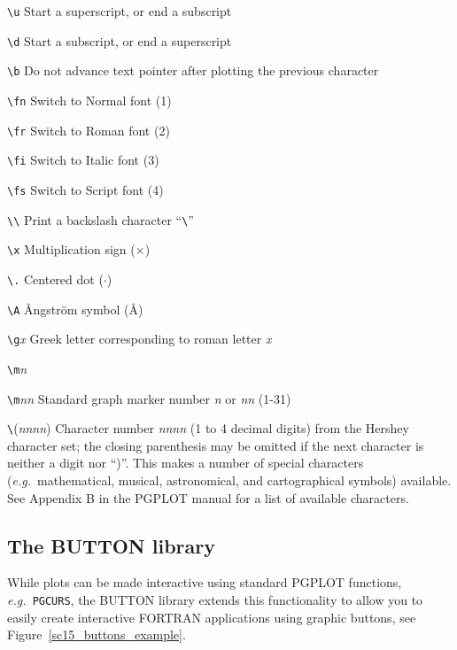 \documentclass[twoside,11pt]{article}
\newcommand{\htmladdnormallink}[2]{#1}
\newcommand{\xlabel}[1]{}
\begin{document}
\begin{description}

\item \verb*|\u| Start a superscript, or end a subscript
\item \verb*|\d| Start a subscript, or end a superscript 
\item \verb*|\b| Do not advance text pointer after plotting the previous character
\item \verb*|\fn| Switch to  Normal font (1)
\item \verb*|\fr| Switch to Roman font (2)
\item \verb*|\fi| Switch to Italic font (3)
\item \verb*|\fs| Switch to Script font (4)
\item \verb*|\\| Print a backslash character ``\verb*|\|''
\item \verb*|\x|  Multiplication sign ($\times$)
\item \verb*|\.| Centered dot ($\cdot$)
\item \verb*|\A| {\rm \AA}ngstr\"{o}m symbol ({\rm \AA})
\item \verb*|\g|{\em x} Greek letter corresponding to roman letter {\em x}
\item \verb*|\m|{\em n}
\item \verb*|\m|{\em nn} Standard graph marker number {\em n} or {\em nn} (1-31)
\item \verb*|\|({\em nnnn}) Character number {\em nnnn} (1 to 4 decimal digits) from the Hershey character set; the closing parenthesis may be omitted if the next character
      is neither a digit nor ``)''. This makes a number of special characters ({\em e.g.\ }mathematical, musical, astronomical, and cartographical symbols)
      available. See \htmladdnormallink{Appendix B}{http://astro.caltech.edu/~tjp/pgplot/hershey.html} in the PGPLOT manual for a list of available characters. 
\end{description}

\subsection{\xlabel{sc15_pgbut}The BUTTON library\label{sc15_pgbut}}

While plots can be made interactive using standard PGPLOT functions, {\em e.g.\ }{\tt PGCURS}, the \htmladdnormallink{BUTTON}{http://www.ucm.es/info/Astrof/button/button.html} library extends this functionality to allow you to easily create interactive FORTRAN applications using graphic buttons, see Figure~\ref{sc15_buttons_example}.
\end{document}
